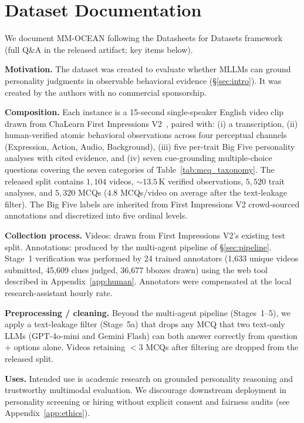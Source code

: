 \documentclass{article}
\newcommand{\benchname}{MM-OCEAN}
\begin{document}
\section{Dataset Documentation}
\label{app:datasheet}

We document \benchname{} following the Datasheets for Datasets framework~\cite{gebru2021datasheets} (full Q\&A in the released artifact; key items below).

\noindent\textbf{Motivation.} The dataset was created to evaluate whether MLLMs can ground personality judgments in observable behavioral evidence (\S\ref{sec:intro}). It was created by the authors with no commercial sponsorship.

\noindent\textbf{Composition.} Each instance is a 15-second single-speaker English video clip drawn from ChaLearn First Impressions V2~\cite{escalante2020modeling}, paired with: (i) a transcription, (ii) human-verified atomic behavioral observations across four perceptual channels (Expression, Action, Audio, Background), (iii) five per-trait Big Five personality analyses with cited evidence, and (iv) seven cue-grounding multiple-choice questions covering the seven categories of Table~\ref{tab:mcq_taxonomy}. The released split contains $1{,}104$ videos, $\sim\!13.5$\,K verified observations, $5{,}520$ trait analyses, and $5{,}320$ MCQs ($4.8$ MCQs/video on average after the text-leakage filter). The Big Five labels are inherited from First Impressions V2 crowd-sourced annotations and discretized into five ordinal levels.

\noindent\textbf{Collection process.} Videos: drawn from First Impressions V2's existing test split. Annotations: produced by the multi-agent pipeline of \S\ref{sec:pipeline}. Stage~1 verification was performed by 24 trained annotators (1,633 unique videos submitted, 45,609 clues judged, 36,677 bboxes drawn) using the web tool described in Appendix~\ref{app:human}. Annotators were compensated at the local research-assistant hourly rate.

\noindent\textbf{Preprocessing / cleaning.} Beyond the multi-agent pipeline (Stages~1--5), we apply a text-leakage filter (Stage~5a) that drops any MCQ that two text-only LLMs (GPT-4o-mini and Gemini Flash) can both answer correctly from question + options alone. Videos retaining $<\!3$ MCQs after filtering are dropped from the released split.

\noindent\textbf{Uses.} Intended use is academic research on grounded personality reasoning and trustworthy multimodal evaluation. We discourage downstream deployment in personality screening or hiring without explicit consent and fairness audits (see Appendix~\ref{app:ethics}).
\end{document}
